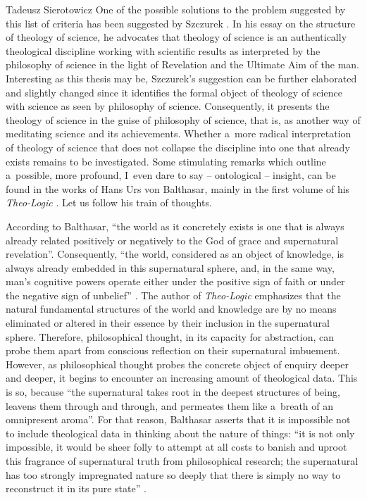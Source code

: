 \begin{artengenv}{Tadeusz Sierotowicz}
One of the possible solutions to the problem suggested by this list of criteria has been suggested by Szczurek 
\parencite*[][pp.133–134]{maczka_teologia_2015-1}. %
 In his essay on the structure of theology of science, he advocates that theology of science is an authentically theological discipline working with scientific results as interpreted by the philosophy of science in the light of Revelation and the Ultimate Aim of the man. Interesting as this thesis may be, Szczurek's suggestion can be further elaborated and slightly changed since it identifies the formal object of theology of science with science as seen by philosophy of science. Consequently, it presents the theology of science in the guise of philosophy of science, that is, as another way of meditating science and its achievements. Whether a~more radical interpretation of theology of science that does not collapse the discipline into one that already exists remains to be investigated. Some stimulating remarks which outline a~possible, more profound, I~even dare to say -- ontological -- insight, can be found in the works of Hans Urs von Balthasar, mainly in the first volume of his \textit{Theo-Logic} 
\parencite[][]{balthasar_theo-logic_2000}. %
 Let us follow his train of thoughts.



According to Balthasar, ``the world as it concretely exists is one that is always already related positively or negatively to the God of grace and supernatural revelation''. Consequently, ``the world, considered as an object of knowledge, is always already embedded in this supernatural sphere, and, in the same way, man's cognitive powers operate either under the positive sign of faith or under the negative sign of unbelief'' 
\parencite[][p.11]{balthasar_theo-logic_2000}. %
 The author of \textit{Theo-Logic} emphasizes that the natural fundamental structures of the world and knowledge are by no means eliminated or altered in their essence by their inclusion in the supernatural sphere. Therefore, philosophical thought, in its capacity for abstraction, can probe them apart from conscious reflection on their supernatural imbuement. However, as philosophical thought probes the concrete object of enquiry deeper and deeper, it begins to encounter an increasing amount of theological data. This is so, because ``the supernatural takes root in the deepest structures of being, leavens them through and through, and permeates them like a~breath of an omnipresent aroma''. For that reason, Balthasar asserts that it is impossible not to include theological data in thinking about the nature of things: ``it is not only impossible, it would be sheer folly to attempt at all costs to banish and uproot this fragrance of supernatural truth from philosophical research; the supernatural has too strongly impregnated nature so deeply that there is simply no way to reconstruct it in its pure state'' 
\parencite[][p.12]{balthasar_theo-logic_2000}.%





\end{artengenv}

